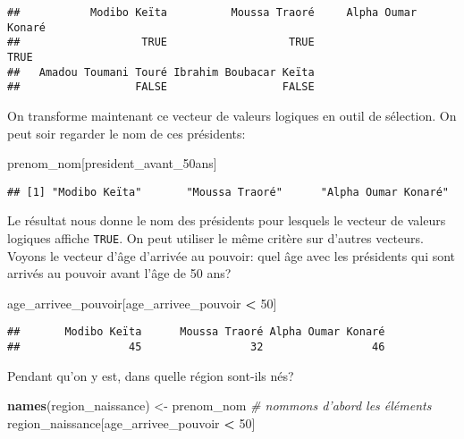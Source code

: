 \documentclass[]{book}
\newenvironment{Shaded}{\begin{snugshade}}{\end{snugshade}}
\newcommand{\KeywordTok}[1]{\textcolor[rgb]{0.13,0.29,0.53}{\textbf{#1}}}
\newcommand{\DecValTok}[1]{\textcolor[rgb]{0.00,0.00,0.81}{#1}}
\newcommand{\StringTok}[1]{\textcolor[rgb]{0.31,0.60,0.02}{#1}}
\newcommand{\CommentTok}[1]{\textcolor[rgb]{0.56,0.35,0.01}{\textit{#1}}}
\newcommand{\OperatorTok}[1]{\textcolor[rgb]{0.81,0.36,0.00}{\textbf{#1}}}
\newcommand{\NormalTok}[1]{#1}
\begin{document}
\begin{verbatim}
##           Modibo Keïta          Moussa Traoré     Alpha Oumar Konaré 
##                   TRUE                   TRUE                   TRUE 
##   Amadou Toumani Touré Ibrahim Boubacar Keïta 
##                  FALSE                  FALSE
\end{verbatim}

On transforme maintenant ce vecteur de valeurs logiques en outil de
sélection. On peut soir regarder le nom de ces présidents:

\begin{Shaded}
\begin{Highlighting}[]
\NormalTok{prenom_nom[president_avant_50ans]}
\end{Highlighting}
\end{Shaded}

\begin{verbatim}
## [1] "Modibo Keïta"       "Moussa Traoré"      "Alpha Oumar Konaré"
\end{verbatim}

Le résultat nous donne le nom des présidents pour lesquels le vecteur de
valeurs logiques affiche \texttt{TRUE}. On peut utiliser le même critère
sur d'autres vecteurs. Voyons le vecteur d'âge d'arrivée au pouvoir:
quel âge avec les présidents qui sont arrivés au pouvoir avant l'âge de
50 ans?

\begin{Shaded}
\begin{Highlighting}[]
\NormalTok{age_arrivee_pouvoir[age_arrivee_pouvoir }\OperatorTok{<}\StringTok{ }\DecValTok{50}\NormalTok{]}
\end{Highlighting}
\end{Shaded}

\begin{verbatim}
##       Modibo Keïta      Moussa Traoré Alpha Oumar Konaré 
##                 45                 32                 46
\end{verbatim}

Pendant qu'on y est, dans quelle région sont-ils nés?

\begin{Shaded}
\begin{Highlighting}[]
\KeywordTok{names}\NormalTok{(region_naissance) <-}\StringTok{ }\NormalTok{prenom_nom }\CommentTok{# nommons d'abord les éléments}
\NormalTok{region_naissance[age_arrivee_pouvoir }\OperatorTok{<}\StringTok{ }\DecValTok{50}\NormalTok{]}
\end{Highlighting}
\end{Shaded}
\end{document}
